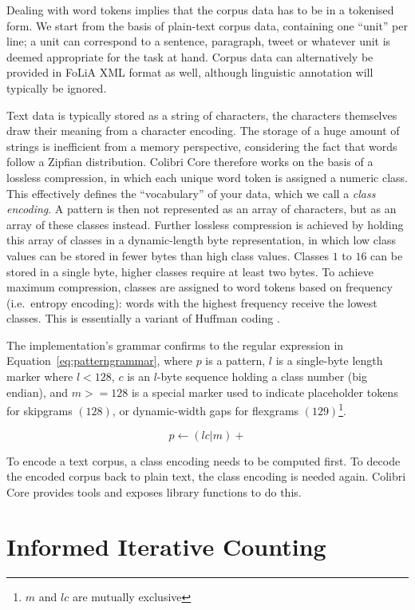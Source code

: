 \documentclass[review]{elsarticle}
\begin{document}
Dealing with word tokens implies that the corpus data has to be in a
tokenised form. We start from the basis of plain-text corpus data, containing one
``unit'' per line; a unit can correspond to a sentence, paragraph, tweet
or whatever unit is deemed appropriate for the task at hand. Corpus data can
alternatively be provided in FoLiA XML format \cite{FOLIAPAPER} as well, although linguistic
annotation will typically be ignored.

Text data is typically stored as a string of characters, the characters
themselves draw their meaning from a character encoding. The storage of a huge
amount of strings is inefficient from a memory perspective, considering the
fact that words follow a Zipfian distribution. Colibri Core therefore works on
the basis of a lossless compression, in which each unique word token is
assigned a numeric class. This effectively defines the ``vocabulary'' of your
data, which we call a \emph{class encoding}. A pattern is then not represented
as an array of characters, but as an array of these classes instead. Further
lossless compression is achieved by holding this array of classes in a
dynamic-length byte representation, in which low class values can be stored in
fewer bytes than high class values. Classes $1$ to $16$ can be stored in a
single byte, higher classes require at least two bytes. To achieve maximum
compression, classes are assigned to word tokens based on frequency (i.e.\
entropy encoding): words with the highest frequency receive the lowest classes.
This is essentially a variant of Huffman coding \citep{HUFFMAN}.

The implementation's grammar confirms to the regular expression in
Equation~\ref{eq:patterngrammar}, where $p$ is a pattern, $l$ is a single-byte
length marker where $l<128$, $c$ is an $l$-byte sequence holding a class number
(big endian), and $m>=128$ is a special marker used to indicate placeholder
tokens for skipgrams $(128)$, or dynamic-width gaps for flexgrams
$(129)$\footnote{$m$ and $lc$ are mutually exclusive}.

\begin{equation}
\label{eq:patterngrammar}
p \leftarrow (lc|m)+
\end{equation}

To encode a text corpus, a class encoding needs to be computed first. To decode
the encoded corpus back to plain text, the class encoding is needed again.
Colibri Core provides tools and exposes library functions to do this.

\section{Informed Iterative Counting}
\end{document}

